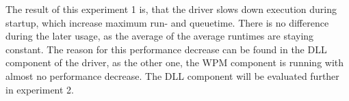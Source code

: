 \medskip

The result of this experiment 1 is, that the driver slows down execution during startup, which increase maximum run- and queuetime. There is no difference during the later usage, as the average of the average runtimes are staying constant. The reason for this performance decrease can be found in the \gls{DLL} component of the driver, as the other one, the \gls{WPM} component is running with almost no performance decrease. The \gls{DLL} component will be evaluated further in experiment 2.